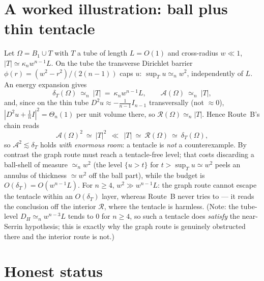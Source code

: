 \documentclass[11pt]{amsart}
\theoremstyle{definition}
\theoremstyle{remark}
\newcommand{\Om}{\Omega}
\newcommand{\dT}{\delta_T}
\newcommand{\Asym}{\mathcal A}
\newcommand{\R}{\mathcal R}
\begin{document}
\section{A worked illustration: ball plus thin tentacle}

Let $\Om=B_1\cup T$ with $T$ a tube of length $L=O(1)$ and cross-radius
$w\ll1$, $|T|\simeq\kappa_n w^{n-1}L$. On the tube the transverse
Dirichlet barrier $\phi(r)=(w^2-r^2)/(2(n-1))$ caps $u$:
$\sup_T u\simeq_n w^2$, independently of $L$. An energy expansion gives
\[
  \dT(\Om)\ \simeq_n\ |T|\ =\ \kappa_n w^{n-1}L,\qquad
  \Asym(\Om)\ \simeq_n\ |T|,
\]
and, since on the thin tube $D^2u\approx-\tfrac1{n-1}I_{n-1}$
transversally (not $\approx0$), $|D^2u+\tfrac1nI|^2=\Theta_n(1)$ per
unit volume there, so $\R(\Om)\simeq_n|T|$. Hence Route~B's chain reads
\[
  \Asym(\Om)^2\ \simeq\ |T|^2\ \ \ll\ \ |T|\ \simeq\ \R(\Om)\ \simeq\ \dT(\Om),
\]
so $\Asym^2\lesssim\dT$ holds \emph{with enormous room}: a tentacle is
\emph{not} a counterexample. By contrast the graph route must reach a
tentacle-free level; that costs discarding a ball-shell of measure
$\simeq_n w^2$ (the level $\{u>t\}$ for $t>\sup_T u\simeq w^2$ peels an
annulus of thickness $\simeq w^2$ off the ball part), while the budget
is $O(\dT)=O(w^{n-1}L)$. For $n\ge4$, $w^2\gg w^{n-1}L$: the graph
route cannot escape the tentacle within an $O(\dT)$ layer, whereas
Route~B never tries to --- it reads the conclusion off the interior
$\R$, where the tentacle is harmless. (Note: the tube-level
$D_H\simeq_n w^{n-3}L$ tends to $0$ for $n\ge4$, so such a tentacle
does \emph{satisfy} the near-Serrin hypothesis; this is exactly why
the graph route is genuinely obstructed there and the interior route
is not.)

\section{Honest status}
\end{document}
